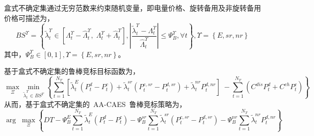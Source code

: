 盒式不确定集通过无穷范数来约束随机变量，即电量价格、旋转备用及非旋转备用价格可描述为，
\begin{equation}
\label{equ:price-uncertainty-BS}
B{S^\Upsilon } = \left\{ {\tilde \lambda _t^\Upsilon  \in \left[ {\Lambda _t^\Upsilon  - \hat \Lambda _t^\Upsilon ,\;\Lambda _t^\Upsilon  + \hat \Lambda _t^\Upsilon } \right],\left| {\frac{{\tilde \lambda _t^\Upsilon  - \Lambda _t^\Upsilon }}{{\hat \Lambda _t^\Upsilon }}} \right| \le \Psi _B^\Upsilon ,\forall t} \right\},\Upsilon  = \left\{ {E,sr,nr} \right\}
\end{equation}
其中，$\Psi _B^\Upsilon  \in \left[ {0,1} \right],\Upsilon  = \left\{ {E,sr,nr} \right\}$。

基于盒式不确定集的鲁棒竞标目标函数为，
\begin{equation}
\mathop {\max }\limits_\Xi  \mathop {\min }\limits_{\tilde \lambda _t^\Upsilon  \in B{S^\Upsilon }} \left\{ {\sum\limits_{t = 1}^{N_T} {\left[ {\tilde \lambda _t^E({P_t^d - P_t^c}) + \tilde \lambda _t^{sr}({P_t^{c,sr} - P_t^{d,sr}}) + \tilde \lambda _t^{nr}P_t^{d,nr}} \right]} \; - \sum\limits_{t = 1}^{N_T} {({C^{dis}P_t^d + C^{ch}P_t^c})}} \right\}
\end{equation}
从而，基于盒式不确定集的~AA-CAES~鲁棒竞标策略为，
\begin{equation}
\label{equ:aa-caes-self-schedule-BS-uncertainty}
\arg \;\mathop {\max }\limits_\Xi  \left\{ {DT - \Psi _B^E\sum\limits_{t = 1}^{N_T} {\tilde \lambda _t^E({P_t^d - P_t^c})} -\Psi _B^{sr}\sum\limits_{t = 1}^{N_T} {\tilde \lambda _t^{sr}({P_t^{c,sr} - P_t^{d,sr}})} - \Psi _B^{nr}\sum\limits_{t = 1}^{N_T} {\tilde \lambda _t^{nr}P_t^{d,nr}} } \right\}
\end{equation}


